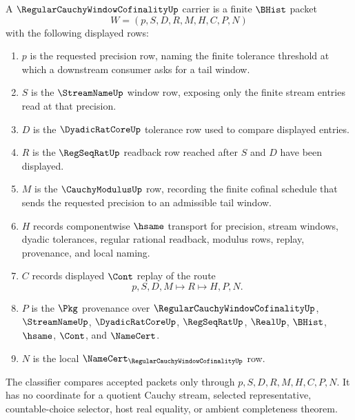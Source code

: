 \begin{definition}
\label{def:regular-cauchy-window-cofinality-carrier}
A $\RegularCauchyWindowCofinalityUp$ carrier is a finite $\BHist$ packet
$$
W=(p,S,D,R,M,H,C,P,N)
$$
with the following displayed rows:
\begin{enumerate}
\item $p$ is the requested precision row, naming the finite tolerance threshold at which a downstream consumer asks for a tail window.
\item $S$ is the $\StreamNameUp$ window row, exposing only the finite stream entries read at that precision.
\item $D$ is the $\DyadicRatCoreUp$ tolerance row used to compare displayed entries.
\item $R$ is the $\RegSeqRatUp$ readback row reached after $S$ and $D$ have been displayed.
\item $M$ is the $\CauchyModulusUp$ row, recording the finite cofinal schedule that sends the requested precision to an admissible tail window.
\item $H$ records componentwise $\hsame$ transport for precision, stream windows, dyadic tolerances, regular rational readback, modulus rows, replay, provenance, and local naming.
\item $C$ records displayed $\Cont$ replay of the route
$$
p,S,D,M \longmapsto R \longmapsto H,P,N .
$$
\item $P$ is the $\Pkg$ provenance over $\RegularCauchyWindowCofinalityUp$, $\StreamNameUp$, $\DyadicRatCoreUp$, $\RegSeqRatUp$, $\RealUp$, $\BHist$, $\hsame$, $\Cont$, and $\NameCert$.
\item $N$ is the local $\NameCert_{\RegularCauchyWindowCofinalityUp}$ row.
\end{enumerate}
The classifier compares accepted packets only through $p,S,D,R,M,H,C,P,N$. It has no coordinate for a quotient Cauchy stream, selected representative, countable-choice selector, host real equality, or ambient completeness theorem.
\end{definition}

